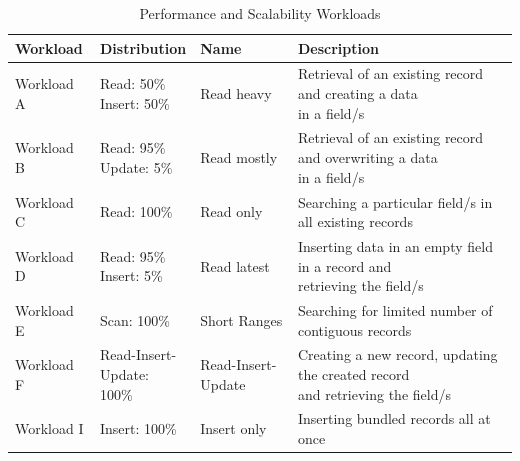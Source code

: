 \documentclass[5p]{elsarticle}
\begin{document}
\begin{table}[ht]
    \centering															
    \caption{Performance and Scalability Workloads}
     \label{table.workload.definition}
     \begin{tabular}{llll}
        \toprule
        Workload & Distribution & Name & Description\\
        \hline
        \rule{0pt}{20pt}Workload A &\makecell[l]{ Read: 50\%  \\ Insert: 50\%} & Read heavy        & \makecell[l]{Retrieval of an existing record and creating a data \\in a field/s} \\
        \rule{0pt}{20pt}Workload B &\makecell[l]{ Read: 95\%  \\ Update: 5\%}  & Read mostly       & \makecell[l]{Retrieval of an existing record and overwriting a data \\in a field/s} \\
        \rule{0pt}{20pt}Workload C &\makecell[l]{ Read: 100\% \\ }             & Read only         & Searching a particular field/s in all existing records \\
        \rule{0pt}{20pt}Workload D &\makecell[l]{ Read: 95\%  \\ Insert: 5\%}  & Read latest       & \makecell[l]{Inserting data in an empty field in a record and \\retrieving the field/s} \\
        \rule{0pt}{20pt}Workload E & Scan: 100\%                               & Short Ranges      & Searching for limited number of contiguous records \\
        \rule{0pt}{20pt}Workload F &\makecell[l]{ Read-Insert-\\Update: 100\%} & Read-Insert-Update& \makecell[l]{Creating a new record, updating the created record \\and retrieving the field/s} \\
        \rule{0pt}{12pt}Workload I &\makecell[l]{ Insert: 100\%\\ }            & Insert only       & Inserting bundled records all at once \\
        \hline
    \end{tabular}															
\end{table}															
\end{document}
